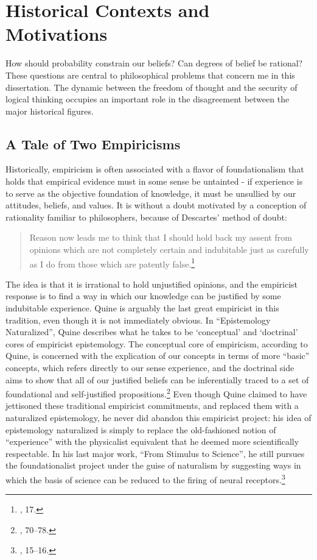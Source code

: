 \hypertarget{historical-context}{%
\section{Historical Contexts and Motivations}\label{historical-context}}

How should probability constrain our beliefs? Can degrees of belief be
rational? These questions are central to philosophical problems that concern me in this dissertation. The dynamic between the freedom of thought and the security of logical thinking occupies an important role in the disagreement between the major historical figures.

\subsection{A Tale of Two Empiricisms}\label{empiricisms}


Historically, empiricism is often associated with a flavor of
foundationalism that holds that empirical evidence must in some sense be
untainted - if experience is to serve as the objective foundation of
knowledge, it must be unsullied by our attitudes, beliefs, and values.
It is without a doubt motivated by a conception of rationality familiar
to philosophers, because of Descartes' method of doubt:

\begin{quote}
Reason now leads me to think that I should hold back my assent from
opinions which are not completely certain and indubitable just as
carefully as I do from those which are patently false.\footnote{\cite{med}, 17.}
\end{quote}

The idea is that it is irrational to hold unjustified opinions, and the
empiricist response is to find a way in which our knowledge can be
justified by some indubitable experience. Quine is arguably the last
great empiricist in this tradition, even though it is not immediately
obvious. In ``Epistemology Naturalized'', Quine describes what he takes to
be `conceptual' and `doctrinal' cores of empiricist epistemology. The
conceptual core of empiricism, according to Quine, is concerned with the
explication of our concepts in terms of more ``basic'' concepts, which
refers directly to our sense experience, and the doctrinal side aims to
show that all of our justified beliefs can be inferentially traced to a
set of foundational and self-justified propositions.\footnote{\cite{epistnat}, 70--78.}
Even though Quine claimed to have jettisoned these traditional
empiricist commitments, and replaced them with a naturalized
epistemology, he never did abandon this empiricist project:
his idea of epistemology naturalized is simply to replace the
old-fashioned notion of ``experience'' with the physicalist equivalent that he
deemed more scientifically respectable. In his last major work, ``From
Stimulus to Science'', he still pursues the foundationalist project
under the guise of naturalism by suggesting ways in which the basis
of science can be reduced to the firing of neural receptors.\footnote{\cite{quinefromstim}, 15--16.}

